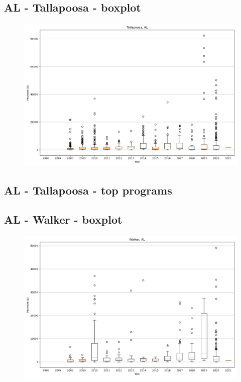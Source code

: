 \subsection*{AL - Tallapoosa - boxplot}
\begin{figure}[h]
\centering
\includegraphics[width=7in]{../output/boxplots/counties/Tallapoosa-AL_boxplot.png}
\end{figure}


\subsection*{AL - Tallapoosa - top programs}

\newpage
\subsection*{AL - Walker - boxplot}
\begin{figure}[h]
\centering
\includegraphics[width=7in]{../output/boxplots/counties/Walker-AL_boxplot.png}
\end{figure}


